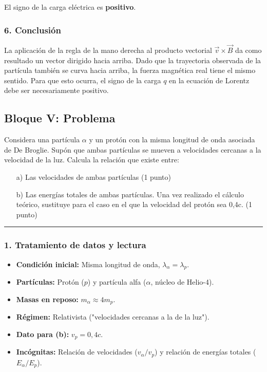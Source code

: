 \begin{cajaresultado}
El signo de la carga eléctrica es \textbf{positivo}.
\end{cajaresultado}

\subsubsection*{6. Conclusión}
\begin{cajaconclusion}
La aplicación de la regla de la mano derecha al producto vectorial $\vec{v} \times \vec{B}$ da como resultado un vector dirigido hacia arriba. Dado que la trayectoria observada de la partícula también se curva hacia arriba, la fuerza magnética real tiene el mismo sentido. Para que esto ocurra, el signo de la carga $q$ en la ecuación de Lorentz debe ser necesariamente positivo.
\end{cajaconclusion}

\newpage

\subsection{Bloque V: Problema}
\label{subsec:B5_2012_jun_ord}
\begin{cajaenunciado}
Considera una partícula $\alpha$ y un protón con la misma longitud de onda asociada de De Broglie. Supón que ambas partículas se mueven a velocidades cercanas a la velocidad de la luz. Calcula la relación que existe entre:
\begin{enumerate}
    \item[a)] Las velocidades de ambas partículas (1 punto)
    \item[b)] Las energías totales de ambas partículas. Una vez realizado el cálculo teórico, sustituye para el caso en el que la velocidad del protón sea 0,4c. (1 punto)
\end{enumerate}
\end{cajaenunciado}
\hrule

\subsubsection*{1. Tratamiento de datos y lectura}
\begin{itemize}
    \item \textbf{Condición inicial:} Misma longitud de onda, $\lambda_\alpha = \lambda_p$.
    \item \textbf{Partículas:} Protón ($p$) y partícula alfa ($\alpha$, núcleo de Helio-4).
    \item \textbf{Masas en reposo:} $m_\alpha \approx 4 m_p$.
    \item \textbf{Régimen:} Relativista ("velocidades cercanas a la de la luz").
    \item \textbf{Dato para (b):} $v_p = 0,4c$.
    \item \textbf{Incógnitas:} Relación de velocidades ($v_\alpha/v_p$) y relación de energías totales ($E_\alpha/E_p$).
\end{itemize}


